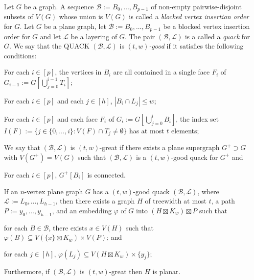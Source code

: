 \documentclass{patmorin}
\newcommand{\defin}[1]{\emph{\textcolor{brightmaroon}{#1}}}
\begin{document}
Let $G$ be a graph.  A sequence $\mathcal{B}:=B_0,\ldots,B_{p-1}$ of non-empty pairwise-disjoint subsets of $V(G)$ whose union is $V(G)$ is called a \defin{blocked vertex insertion order} for $G$. Let $G$ be a plane graph, let $\mathcal{B}:=B_0,\ldots,B_{p-1}$ be a blocked vertex insertion order for $G$ and let $\mathcal{L}$ be a layering of $G$.   The pair $(\mathcal{B},\mathcal{L})$ is a called a \defin{quack} for $G$.  We say that  the QUACK $(\mathcal{B},\mathcal{L})$ is \defin{$(t,w)$-good} if it satisfies the following conditions:
\begin{compactenum}[({good}-a)]
  \item For each $i\in[p]$, the vertices in $B_i$ are all contained in a single face $F_i$ of $G_{i-1}:=G[\bigcup_{j=0}^{i-1} T_i]$;
  \item For each $i\in[p]$ and each $j\in[h]$, $|B_i\cap L_j|\le w$;
  \item For each $i\in[p]$ and each face $F_i$ of $G_i:=G[\bigcup_{j=0}^i B_i]$, the index set $I(F):=\{j\in\{0,\ldots,i\}:V(F)\cap T_j\neq\emptyset\}$ has at most $t$ elements;
\end{compactenum}

We say that $(\mathcal{B},\mathcal{L})$ is $(t,w)$-great if there exists a plane supergraph $G^+\supset G$ with $V(G^+)=V(G)$ such that $(\mathcal{B},\mathcal{L})$ is a $(t,w)$-good quack for $G^+$ and

\begin{compactenum}[({good}-a)]\setcounter{enumi}{23}
  \item For each $i\in[p]$, $G^+[B_i]$ is connected.
\end{compactenum}

\begin{lem}\label{tw_good_quack}
  If an $n$-vertex plane graph $G$ has a $(t,w)$-good quack $(\mathcal{B},\mathcal{L})$, where $\mathcal{L}:=L_0,\ldots,L_{h-1}$, then there exists a graph $H$ of treewidth at most $t$, a path $P:=y_0,\ldots,y_{h-1}$, and an embedding $\varphi$ of $G$ into $(H\boxtimes K_w)\boxtimes P$ such that
  \begin{compactenum}[(i)]
    \item for each $B\in\mathcal{B}$, there exists $x\in V(H)$ such that $\varphi(B)\subseteq V(\{x\}\boxtimes K_w)\times V(P)$; and
    \item for each $j\in[h]$, $\varphi(L_j)\subseteq V(H\boxtimes K_w)\times\{y_j\}$;
  \end{compactenum}
  Furthermore, if $(\mathcal{B},\mathcal{L})$ is $(t,w)$-great then $H$ is planar.
\end{lem}
\end{document}
